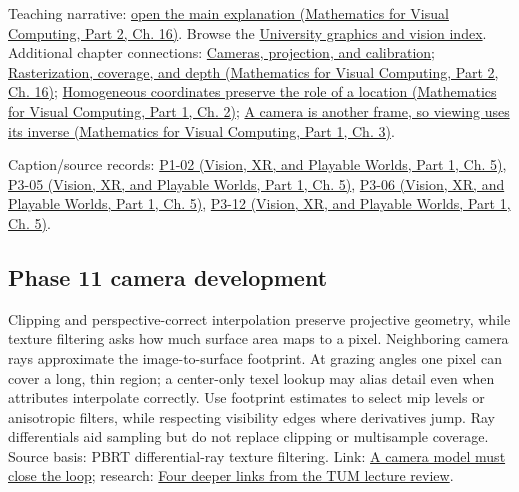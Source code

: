 Teaching narrative: \href{../02-Mathematics-for-Visual-Computing-P02/main.pdf\#03-visual-computing-i-ch012-rasterization-coverage-and-depth}{open the main explanation (Mathematics for Visual Computing, Part 2, Ch. 16)}. Browse the \hyperref[appendix-a6d556a4ef50-university-graphics-vision-and-photography---independent-series]{University graphics and vision index}. Additional chapter connections: \hyperref[03-visual-computing-i-ch003-cameras-projection-and-calibration]{Cameras, projection, and calibration}; \href{../02-Mathematics-for-Visual-Computing-P02/main.pdf\#03-visual-computing-i-ch012-rasterization-coverage-and-depth}{Rasterization, coverage, and depth (Mathematics for Visual Computing, Part 2, Ch. 16)}; \href{../02-Mathematics-for-Visual-Computing-P01/main.pdf\#01-foundations-i-ch018-homogeneous-coordinates-preserve-the-role-of-a-location}{Homogeneous coordinates preserve the role of a location (Mathematics for Visual Computing, Part 1, Ch. 2)}; \href{../02-Mathematics-for-Visual-Computing-P01/main.pdf\#01-foundations-i-ch019-a-camera-is-another-frame-so-viewing-uses-its-inverse}{A camera is another frame, so viewing uses its inverse (Mathematics for Visual Computing, Part 1, Ch. 3)}.

Caption/source records: \href{../07-Vision-XR-and-Playable-Worlds-P01/main.pdf\#04-visual-computing-ii-ch036-p1-02---module-1.2-course-intro-administrivia-part-2-graphics-visual-computing-2026}{P1-02 (Vision, XR, and Playable Worlds, Part 1, Ch. 5)}, \href{../07-Vision-XR-and-Playable-Worlds-P01/main.pdf\#04-visual-computing-ii-ch036-p3-05---the-camera-transform}{P3-05 (Vision, XR, and Playable Worlds, Part 1, Ch. 5)}, \href{../07-Vision-XR-and-Playable-Worlds-P01/main.pdf\#04-visual-computing-ii-ch036-p3-06---clipping}{P3-06 (Vision, XR, and Playable Worlds, Part 1, Ch. 5)}, \href{../07-Vision-XR-and-Playable-Worlds-P01/main.pdf\#04-visual-computing-ii-ch036-p3-12---scan-conversion}{P3-12 (Vision, XR, and Playable Worlds, Part 1, Ch. 5)}.

\subsection{Phase 11 camera development}\label{appendix-40426e4b2103-phase-11-camera-development}

\hypertarget{appendix-40426e4b2103-phase-11-camera-development}{}

Clipping and perspective-correct interpolation preserve projective geometry, while texture filtering asks how much surface area maps to a pixel. Neighboring camera rays approximate the image-to-surface footprint. At grazing angles one pixel can cover a long, thin region; a center-only texel lookup may alias detail even when attributes interpolate correctly. Use footprint estimates to select mip levels or anisotropic filters, while respecting visibility edges where derivatives jump. Ray differentials aid sampling but do not replace clipping or multisample coverage. Source basis: PBRT differential-ray texture filtering. Link: \hyperref[02-foundations-ii-ch037-a-camera-model-must-close-the-loop]{A camera model must close the loop}; research: \hyperref[02-foundations-ii-ch036-four-deeper-links-from-the-tum-lecture-review]{Four deeper links from the TUM lecture review}.


